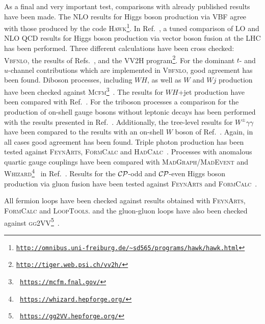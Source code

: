 \documentclass[english,12pt]{article}
\begin{document}
As a final and very important test, comparisons with already published results
have been made. The NLO results for Higgs boson production via VBF agree with those
produced by the code \textsc{Hawk}\footnote{
{\tt \href{http://omnibus.uni-freiburg.de/~sd565/programs/hawk/hawk.html}{http://omnibus.uni-freiburg.de/\~{}sd565/programs/hawk/hawk.html}}}.  In
Ref.~\cite{:2008uu}, a tuned comparison of LO and NLO QCD results for Higgs 
boson production via vector boson fusion at the LHC has been performed. Three
different calculations have been cross checked: \textsc{Vbfnlo}, the results of
Refs.~\cite{Ciccolini:2007jr,Ciccolini:2007ec}, and the \textsc{VV2H}
program\footnote{\tt \url{http://tiger.web.psi.ch/vv2h/}}. For the dominant
$t$- and $u$-channel contributions which are implemented in \textsc{Vbfnlo},
good agreement has been found.  
Diboson processes, including $WH$, as well as $W$ and $Wj$ production have been
checked against \textsc{Mcfm}\footnote{{\tt
\url{https://mcfm.fnal.gov/}}}~\cite{Campbell:1999ah,Campbell:2011bn,Campbell:2011cu}.
The results for $WH$+jet production have been compared with Ref.~\cite{JiJuan:2010ga}.
For the triboson processes a comparison for the
production of on-shell gauge bosons without leptonic decays has been performed
with the results presented in Ref.~\cite{Binoth:2008kt}. Additionally,
the tree-level results for $W^\pm\gamma\gamma$ have been compared to the
results with an on-shell $W$ boson of Ref.~\cite{Baur:2010zf}. Again, in
all cases good agreement has been found.  Triple photon production has been tested against 
\textsc{FeynArts}, \textsc{FormCalc} and \textsc{HadCalc}~\cite{Hahn:1998yk,Hahn:2006qw,Rauch:2008fy}.
Processes with anomalous quartic gauge couplings have been compared with \textsc{MadGraph/MadEvent} and
\textsc{Whizard}\footnote{\tt
\url{https://whizard.hepforge.org/}}~\cite{Kilian:2007gr}
in Ref.~\cite{Degrande:2013rea}.
Results for the $\cal{CP}$-odd and $\cal{CP}$-even Higgs boson production via gluon
fusion have been tested against
\textsc{FeynArts} and \textsc{FormCalc}~\cite{Hahn:2000kx,Hahn:2001rv}.  

All fermion loops have been checked against results obtained with \textsc{FeynArts}, \textsc{FormCalc} and \textsc{LoopTools}. 
and the gluon-gluon loops have also been checked against \textsc{gg2VV}\footnote{\tt 
\url{https://gg2VV.hepforge.org/}}~\cite{Binoth:2008pr,Kauer:2012ma}.


\end{document}
